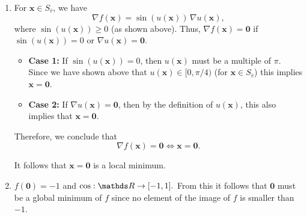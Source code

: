 \documentclass[a4paper]{article}
\begin{document}
{\begin{enumerate}
  For $\mathbf{x} \in S_{\bar{r}}$, it holds that $u(\mathbf{x}) \geq 0$, since $$0 \leq \frac{1}{2} (x_1 + x_2)^2 = \frac{1}{2}x_1^2 + \frac{1}{2}x_2^2 + x_1x_2 \leq x_1^2 + x_2^2 + x_1x_2 = u(\mathbf{x}),$$ and that $u(\mathbf{x}) < \pi/4$.
  This implies that $\cos(u(\mathbf{x})) > 0$ and $\sin(u(\mathbf{x})) \geq 0$. \\
  $\nabla u(\mathbf{x}) \nabla u(\mathbf{x})^\top$ is positive semi-definite since $$\mathbf{v}^\top \nabla u(\mathbf{x}) \nabla u(\mathbf{x})^\top \mathbf{v} = (\mathbf{v}^\top\nabla u(\mathbf{x}))^2 \geq 0.$$
  $\nabla^2 u(\mathbf{x})$ is positive definite since $$\mathbf{v}^\top \nabla^2 u(\mathbf{x}) \mathbf{v} = 2 v_1^2 + 2v_1v_2 + 2 v_2^2 = v_1^2 + v_2^2 + (v_1 + v_2)^2 \geq 0$$
  and equality only holds if $\mathbf{v} = \mathbf{0}$. \\
  So, in total, for $\mathbf{x} \in S_{\bar{r}}$, we have that
  \begin{equation*}
    \nabla^2 f(\mathbf{x}) = \underbrace{\cos(u(\mathbf{x}))}_{> 0} \underbrace{\nabla u(\mathbf{x}) \nabla u(\mathbf{x})^\top}_{\text{p.s.d.}} + \underbrace{\sin(u(\mathbf{x}))}_{\geq 0} \underbrace{\nabla^2 u(\mathbf{x})}_{\text{p.d.}}.
  \end{equation*}
  $\Rightarrow \nabla^2 f(\mathbf{x})$ is positive semi-definite. \\
  $\Rightarrow f_{|S_{\overline{r}}}$ is convex.
\item For $\mathbf{x} \in S_{\bar{r}}$, we have
\[
\nabla f(\mathbf{x}) = \sin(u(\mathbf{x})) \, \nabla u(\mathbf{x}),
\]
where $\sin(u(\mathbf{x})) \ge 0$ (as shown above). Thus, $\nabla f(\mathbf{x}) = \mathbf{0}$ if $\sin(u(\mathbf{x})) = 0$ or $\nabla u(\mathbf{x}) = \mathbf{0}$.

\begin{itemize}
    \item \textbf{Case 1:} If $\sin(u(\mathbf{x})) = 0$, then $u(\mathbf{x})$ must be a multiple of $\pi$. Since we have shown above that $u(\mathbf{x}) \in [0, \pi/4)$ (for $\mathbf{x} \in S_{\bar{r}}$) this implies $\mathbf{x} = \mathbf{0}$.
    
    \item \textbf{Case 2:} If $\nabla u(\mathbf{x}) = \mathbf{0}$, then by the definition of $u(\mathbf{x})$, this also implies that $\mathbf{x} = \mathbf{0}$.
\end{itemize}

Therefore, we conclude that
\[
\nabla f(\mathbf{x}) = \mathbf{0} \iff \mathbf{x} = \mathbf{0}.
\]

  It follows that $\mathbf{x} = \mathbf{0}$ is a local minimum.
\item $f(\mathbf{0}) = -1$ and $\cos: \R \rightarrow [-1, 1].$ From this it follows that $\mathbf{0}$ must be a global minimum of $f$ since no element of the image of $f$ is smaller than $-1$.
\end{enumerate}
}
\end{document}
